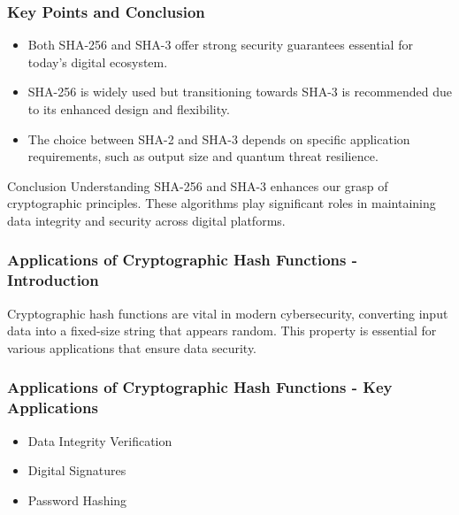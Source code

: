 \documentclass{beamer}
\begin{document}
\begin{frame}[fragile]
    \frametitle{Key Points and Conclusion}
    \begin{itemize}
        \item Both SHA-256 and SHA-3 offer strong security guarantees essential for today's digital ecosystem.
        \item SHA-256 is widely used but transitioning towards SHA-3 is recommended due to its enhanced design and flexibility.
        \item The choice between SHA-2 and SHA-3 depends on specific application requirements, such as output size and quantum threat resilience.
    \end{itemize}

    \begin{block}{Conclusion}
        Understanding SHA-256 and SHA-3 enhances our grasp of cryptographic principles. 
        These algorithms play significant roles in maintaining data integrity and security across digital platforms.
    \end{block}
\end{frame}

\begin{frame}[fragile]
    \frametitle{Applications of Cryptographic Hash Functions - Introduction}
    Cryptographic hash functions are vital in modern cybersecurity, converting input data into a fixed-size string that appears random. This property is essential for various applications that ensure data security.
\end{frame}

\begin{frame}[fragile]
    \frametitle{Applications of Cryptographic Hash Functions - Key Applications}
    \begin{itemize}
        \item Data Integrity Verification
        \item Digital Signatures
        \item Password Hashing
    \end{itemize}
\end{frame}
\end{document}

